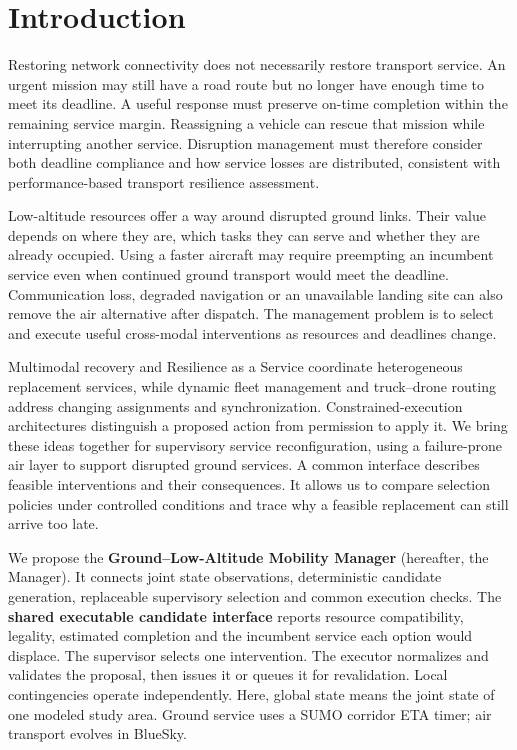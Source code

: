 \documentclass[]{interact}
\theoremstyle{plain}
\theoremstyle{definition}
\theoremstyle{remark}
\begin{document}
\section{Introduction}

Restoring network connectivity does not necessarily restore transport service. An urgent mission may still have a road route but no longer have enough time to meet its deadline. A useful response must preserve on-time completion within the remaining service margin. Reassigning a vehicle can rescue that mission while interrupting another service. Disruption management must therefore consider both deadline compliance and how service losses are distributed, consistent with performance-based transport resilience assessment. \citep{ref1}

Low-altitude resources offer a way around disrupted ground links. Their value depends on where they are, which tasks they can serve and whether they are already occupied. Using a faster aircraft may require preempting an incumbent service even when continued ground transport would meet the deadline. Communication loss, degraded navigation or an unavailable landing site can also remove the air alternative after dispatch. The management problem is to select and execute useful cross-modal interventions as resources and deadlines change.

Multimodal recovery and Resilience as a Service coordinate heterogeneous replacement services, while dynamic fleet management and truck--drone routing address changing assignments and synchronization. \citep{ref4,ref19,ref20,ref21,ref22} Constrained-execution architectures distinguish a proposed action from permission to apply it. \citep{ref8} We bring these ideas together for supervisory service reconfiguration, using a failure-prone air layer to support disrupted ground services. A common interface describes feasible interventions and their consequences. It allows us to compare selection policies under controlled conditions and trace why a feasible replacement can still arrive too late.

We propose the \textbf{Ground--Low-Altitude Mobility Manager} (hereafter, the Manager). It connects joint state observations, deterministic candidate generation, replaceable supervisory selection and common execution checks. The \textbf{shared executable candidate interface} reports resource compatibility, legality, estimated completion and the incumbent service each option would displace. The supervisor selects one intervention. The executor normalizes and validates the proposal, then issues it or queues it for revalidation. Local contingencies operate independently. Here, global state means the joint state of one modeled study area. Ground service uses a SUMO corridor ETA timer; air transport evolves in BlueSky.
\end{document}
